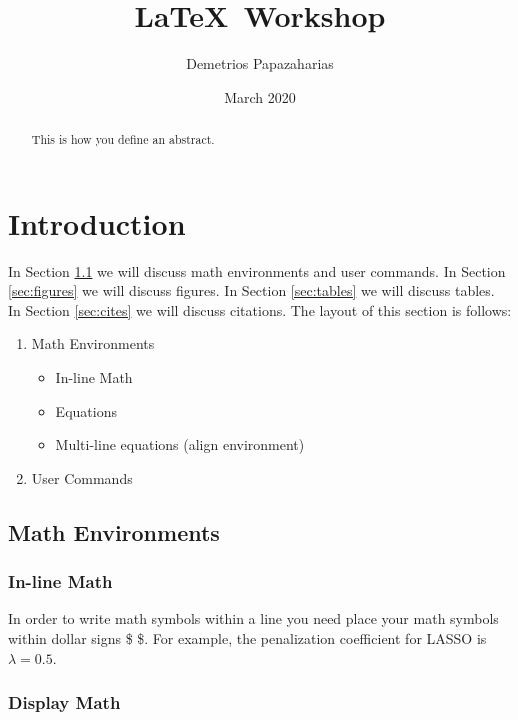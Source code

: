 \documentclass{article}
\title{\LaTeX \, Workshop}
\author{Demetrios Papazaharias}
\date{March 2020}
\begin{document}
\maketitle
\begin{abstract}
    This is how you define an abstract.
\end{abstract}

\maketitle

\section{Introduction}\label{sec:Introduction}

In Section \ref{subsec:mathenviornments} we will discuss math environments and user commands. In Section \ref{sec:figures} we will discuss figures. In Section \ref{sec:tables} we will discuss tables. In Section \ref{sec:cites} we will discuss citations. The layout of this section is follows:

\begin{enumerate}
	\item Math Environments
\begin{itemize}
	\item In-line Math 
	\item Equations
	\item Multi-line equations (align environment)
\end{itemize}
	\item  User Commands
\end{enumerate}

\subsection{Math Environments} \label{subsec:mathenviornments}


\subsubsection{In-line Math} \label{subsubsec:inlinemath}

In order to write math symbols within a line you need place your math symbols within dollar signs \$  \$. For example, the penalization coefficient for LASSO is $\lambda = 0.5$. 

\subsubsection{Display Math}\label{subsubsec:displaymath}
\end{document}
